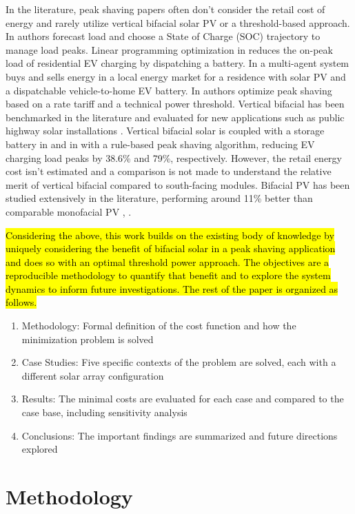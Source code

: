 \documentclass[journal,article,submit,pdftex,moreauthors]{Definitions/mdpi}
\begin{document}
In the literature, peak shaving papers often don't consider the retail cost of energy and rarely utilize vertical bifacial solar PV or a threshold-based approach. In \cite{Reihani2016} authors forecast load and choose a State of Charge (SOC) trajectory to manage load peaks. Linear programming optimization in \cite{Lee2014} reduces the on-peak load of residential EV charging by dispatching a battery. In \cite{Gazafroudi2018} a multi-agent system buys and sells energy in a local energy market for a residence with solar PV and a dispatchable vehicle-to-home EV battery. In \cite{Zheng2015} authors optimize peak shaving based on a rate tariff and a technical power threshold. Vertical bifacial has been benchmarked in the literature and evaluated for new applications such as public highway solar installations \cite{Niccolai2022}. Vertical bifacial solar is coupled with a storage battery in \cite{Wallberg2022} and in \cite{Castellucci2022} with a rule-based peak shaving algorithm, reducing EV charging load peaks by 38.6\% and 79\%, respectively. However, the retail energy cost isn't estimated and a comparison is not made to understand the relative merit of vertical bifacial compared to south-facing modules. Bifacial PV has been studied extensively in the literature, performing around 11\% better than comparable monofacial PV \cite{Ogliari2023}, . 

\hl{Considering the above, this work builds on the existing body of knowledge by uniquely considering the benefit of bifacial solar in a peak shaving application and does so with an optimal threshold power approach. The objectives are a reproducible methodology to quantify that benefit and to explore the system dynamics to inform future investigations. The rest of the paper is organized as follows.} 

\begin{enumerate}
	\item Methodology: Formal definition of the cost function and how the minimization problem is solved
	\item Case Studies: Five specific contexts of the problem are solved, each with a different solar array configuration
	\item Results: The minimal costs are evaluated for each case and compared to the case base, including sensitivity analysis
	\item Conclusions: The important findings are summarized and future directions explored
\end{enumerate}

\section{Methodology}\label{methodology}%
\end{document}
